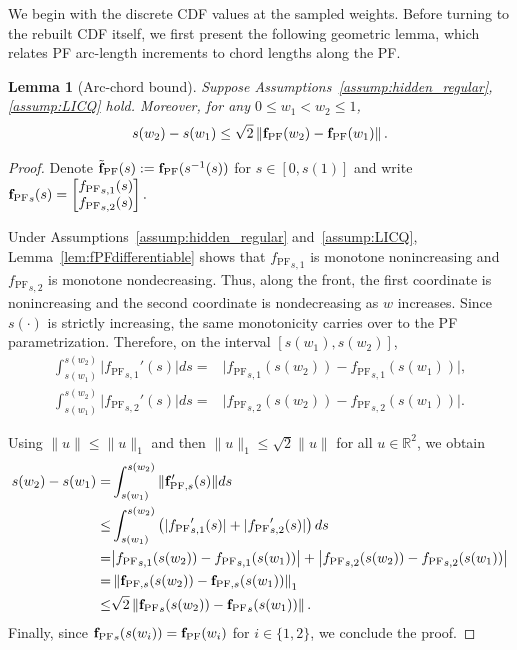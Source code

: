 \documentclass{article}
\newtheorem{lemma}{Lemma}
\newcommand{\f}{\mathbf{f}}
\newcommand{\fPF}{{\mathbf{f}_{\rm PF}}}
\begin{document}
We begin with the discrete CDF values at the sampled weights. Before turning to the rebuilt CDF itself, we first present the following geometric lemma, which relates PF arc-length increments to chord lengths along the PF.
\begin{lemma}[Arc-chord bound]
\label{lemma:arc_chord_sqrt2_pf}
Suppose Assumptions~\ref{assump:hidden_regular}, \ref{assump:LICQ} hold.
Moreover, for any $0\le w_1<w_2\le 1$, 
\begin{align}
s(w_2)-s(w_1)
 \le \sqrt{2} 
\left\|\fPF(w_2)
-\fPF(w_1)\right\|.
\end{align}
\end{lemma}
\begin{proof}
Denote $\tilde{\f}_{\mathrm{PF}}(s):=\fPF(s^{-1}(s))$ for $s\in[0,s(1)]$ and write
$
\fPF_s(s)
=
\begin{bmatrix}
{f_{\mathrm{PF}}}_{s,1}(s)\\
{f_{\mathrm{PF}}}_{s,2}(s)
\end{bmatrix}.
$

Under Assumptions~\ref{assump:hidden_regular} and~\ref{assump:LICQ}, Lemma~\ref{lem:fPFdifferentiable} shows that ${f_{\mathrm{PF}}}_{s,1}$ is monotone nonincreasing and ${f_{\mathrm{PF}}}_{s,2}$ is monotone nondecreasing. Thus, along the front, the first coordinate is nonincreasing and the second coordinate is nondecreasing as $w$ increases. Since $s(\cdot)$ is strictly increasing, the same monotonicity carries over to the PF parametrization.
Therefore, on the interval $[s(w_1),s(w_2)]$,
\begin{align}
\int_{s(w_1)}^{s(w_2)} \big|{f_{\mathrm{PF}}}_{s,1}'(s)\big| ds
= & 
\big|{f_{\mathrm{PF}}}_{s,1}(s(w_2)) - {f_{\mathrm{PF}}}_{s,1}(s(w_1))\big|, \\
\int_{s(w_1)}^{s(w_2)} \big|{f_{\mathrm{PF}}}_{s,2}'(s)\big| ds
= & 
\big|{f_{\mathrm{PF}}}_{s,2}(s(w_2)) - {f_{\mathrm{PF}}}_{s,2}(s(w_1))\big|.
\end{align}

Using $\|u\|\le \|u\|_1$ and then $\|u\|_1\le \sqrt{2}\|u\|$ for all $u\in\mathbb R^2$, we obtain
\begin{align*}
s(w_2)-s(w_1)
= & 
\int_{s(w_1)}^{s(w_2)} \|\f_{\mathrm{PF},s}'(s)\| ds \\
\leq &
\int_{s(w_1)}^{s(w_2)}
\left(
|{f_{\mathrm{PF}}}_{s,1}'(s)| + |{f_{\mathrm{PF}}}_{s,2}'(s)|
\right)ds \\
= & 
\big|{f_{\mathrm{PF}}}_{s,1}(s(w_2)) - {f_{\mathrm{PF}}}_{s,1}(s(w_1))\big|
+
\big|{f_{\mathrm{PF}}}_{s,2}(s(w_2)) - {f_{\mathrm{PF}}}_{s,2}(s(w_1))\big| \\
= & 
\left\|
\f_{\mathrm{PF},s}(s(w_2))
-
\f_{\mathrm{PF},s}(s(w_1))
\right\|_1 \\
\leq &
\sqrt{2} 
\left\|
\fPF_s(s(w_2))
-
\fPF_s(s(w_1))
\right\|.
\end{align*}
Finally, since $\fPF_s(s(w_i))=\fPF(w_i)$ for $i\in\{1,2\}$, we conclude the proof.
\end{proof}
\end{document}
